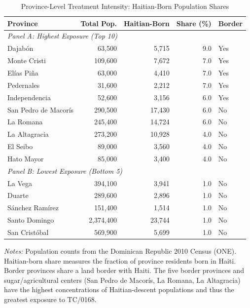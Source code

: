 \begin{table}[H]
\centering
\caption{Province-Level Treatment Intensity: Haitian-Born Population Shares}
\begin{threeparttable}
\begin{tabular}{lrrrl}
\toprule
Province & Total Pop. & Haitian-Born & Share (\%) & Border \\
\midrule
\multicolumn{5}{l}{\textit{Panel A: Highest Exposure (Top 10)}} \\
Dajabón & 63,500 & 5,715 & 9.0 & Yes \\
Monte Cristi & 109,600 & 7,672 & 7.0 & Yes \\
Elías Piña & 63,000 & 4,410 & 7.0 & Yes \\
Pedernales & 31,600 & 2,212 & 7.0 & Yes \\
Independencia & 52,600 & 3,156 & 6.0 & Yes \\
San Pedro de Macorís & 290,500 & 17,430 & 6.0 & No \\
La Romana & 245,400 & 14,724 & 6.0 & No \\
La Altagracia & 273,200 & 10,928 & 4.0 & No \\
El Seibo & 89,000 & 3,560 & 4.0 & No \\
Hato Mayor & 85,000 & 3,400 & 4.0 & No \\
\midrule
\multicolumn{5}{l}{\textit{Panel B: Lowest Exposure (Bottom 5)}} \\
La Vega & 394,100 & 3,941 & 1.0 & No \\
Duarte & 289,600 & 2,896 & 1.0 & No \\
Sánchez Ramírez & 151,400 & 1,514 & 1.0 & No \\
Santo Domingo & 2,374,400 & 23,744 & 1.0 & No \\
San Cristóbal & 569,900 & 5,699 & 1.0 & No \\
\bottomrule
\end{tabular}
\begin{tablenotes}[flushleft]
\small
\item \textit{Notes:} Population counts from the Dominican Republic 2010 Census (ONE). Haitian-born share measures the fraction of province residents born in Haiti. Border provinces share a land border with Haiti. The five border provinces and sugar/agricultural centers (San Pedro de Macor\'{i}s, La Romana, La Altagracia) have the highest concentrations of Haitian-descent populations and thus the greatest exposure to TC/0168.
\end{tablenotes}
\end{threeparttable}
\label{tab:provinces}
\end{table}


